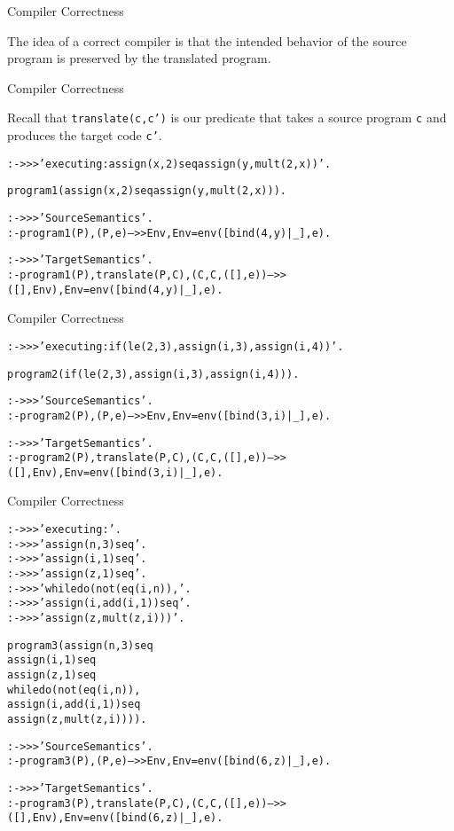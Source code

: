 \documentclass{beamer}
\begin{document}
\begin{frame}[fragile]{Compiler Correctness}

The idea of a correct compiler is that the intended behavior
of the source program is preserved by the translated program.

\end{frame}

\begin{frame}[fragile]{Compiler Correctness}

\small
Recall that {\tt translate(c,c')} is our predicate that takes a source program {\tt c} and
produces the target code {\tt c'}.

\tiny
\begin{alltt}
:- >>> 'executing: assign(x,2) seq assign(y,mult(2,x))'.

program1(assign(x,2) seq assign(y,mult(2,x))).

:- >>> 'Source Semantics'.
:- program1(P),(P,e) -->> Env, Env = env([bind(4,y)|_],e).

:- >>> 'Target Semantics'.
:- program1(P),translate(P,C),(C,C,([],e)) -->> ([],Env), Env = env([bind(4,y)|_],e).

\end{alltt}
\end{frame}

\begin{frame}[fragile]{Compiler Correctness}

\tiny
\begin{alltt}
:- >>> 'executing: if(le(2,3),assign(i,3),assign(i,4))'.

program2(if(le(2,3),assign(i,3),assign(i,4))).

:- >>> 'Source Semantics'.
:- program2(P),(P,e) -->> Env, Env = env([bind(3,i)|_],e).

:- >>> 'Target Semantics'.
:- program2(P),translate(P,C),(C,C,([],e)) -->> ([],Env), Env = env([bind(3,i)|_],e).
\end{alltt}
\end{frame}

\begin{frame}[fragile]{Compiler Correctness}

\tiny
\begin{alltt}
:- >>> 'executing: '.
:- >>> 'assign(n,3) seq'.
:- >>> 'assign(i,1) seq'.
:- >>> 'assign(z,1) seq'.
:- >>> 'whiledo(not(eq(i,n)),'.
:- >>> '   assign(i,add(i,1)) seq'.
:- >>> '   assign(z,mult(z,i)))'.

program3(assign(n,3) seq
         assign(i,1) seq
         assign(z,1) seq
         whiledo(not(eq(i,n)),
           assign(i,add(i,1)) seq
           assign(z,mult(z,i)))).

:- >>> 'Source Semantics'.
:- program3(P),(P,e) -->> Env, Env = env([bind(6,z)|_],e).

:- >>> 'Target Semantics'.
:- program3(P),translate(P,C),(C,C,([],e)) -->> ([],Env), Env = env([bind(6,z)|_],e).\end{alltt}
\end{frame}
\end{document}
